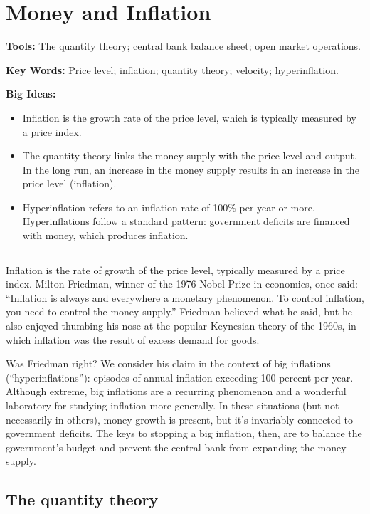 \chapter{Money and Inflation}\label{chp:mpin}
\hypertarget{inflation}{}

\textbf{Tools:} The quantity theory; central bank balance sheet; open market operations.

\textbf{Key Words:} Price level; inflation; quantity theory; velocity; hyperinflation.

\textbf{Big Ideas:}
\vspace{-0.1in}
\begin{itemize}
\item Inflation is the growth rate of the price level,
which is typically measured by a price index.
\item The quantity theory links the money supply with the price level and output.
In the long run, an increase in the money supply results in an increase in the price level (inflation).
\item Hyperinflation refers to an inflation rate of 100\% per year or more.
Hyperinflations follow a standard pattern: government deficits are financed with money,
which produces inflation.
\end{itemize}
\rule{\textwidth}{1pt}

Inflation is the rate of growth of the price level,
typically measured by a price index.
Milton Friedman, winner of the 1976 Nobel Prize in economics, once
said: ``Inflation is always and everywhere a monetary phenomenon.
To control inflation, you need to control the money supply.''
Friedman believed what he said, but he also enjoyed
thumbing his nose at the popular Keynesian theory of the 1960s,
in which inflation was the result of excess demand for goods.

Was Friedman right?
We consider his claim in the context of big inflations (``hyperinflations''):
episodes of annual inflation exceeding 100 percent per year.
Although extreme, big inflations are a recurring phenomenon
and a wonderful laboratory for
studying inflation more generally.
In these situations (but not necessarily in others),
money growth is present,
but it's invariably connected to government deficits.
The keys to stopping a big inflation, then, are to
balance the government's budget and prevent the central bank from expanding the money supply.


\section{The quantity theory}

